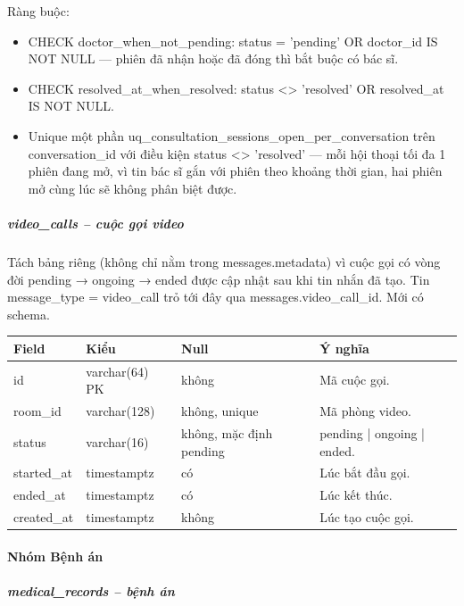 Ràng buộc:
\begin{itemize}
  \item CHECK doctor\_when\_not\_pending: status = 'pending' OR doctor\_id IS NOT NULL --- phiên đã nhận hoặc đã đóng thì bắt buộc có bác sĩ.
  \item CHECK resolved\_at\_when\_resolved: status <> 'resolved' OR resolved\_at IS NOT NULL.
  \item Unique một phần uq\_consultation\_sessions\_open\_per\_conversation trên conversation\_id với điều kiện status <> 'resolved' --- mỗi hội thoại tối đa 1 phiên đang mở, vì tin bác sĩ gắn với phiên theo khoảng thời gian, hai phiên mở cùng lúc sẽ không phân biệt được.
\end{itemize}

\subparagraph{video\_calls -- cuộc gọi video}

Tách bảng riêng (không chỉ nằm trong messages.metadata) vì cuộc gọi có vòng đời pending → ongoing → ended được cập nhật sau khi tin nhắn đã tạo. Tin message\_type = video\_call trỏ tới đây qua messages.video\_call\_id. Mới có schema.
\begin{longtable}{|>{\raggedright\arraybackslash}p{0.250\dimexpr\linewidth-8\tabcolsep\relax}|>{\raggedright\arraybackslash}p{0.250\dimexpr\linewidth-8\tabcolsep\relax}|>{\raggedright\arraybackslash}p{0.250\dimexpr\linewidth-8\tabcolsep\relax}|>{\raggedright\arraybackslash}p{0.250\dimexpr\linewidth-8\tabcolsep\relax}|}
\hline
\textbf{Field} & \textbf{Kiểu} & \textbf{Null} & \textbf{Ý nghĩa} \\ \hline
\endhead
id & varchar(64) PK & không & Mã cuộc gọi. \\ \hline
room\_id & varchar(128) & không, unique & Mã phòng video. \\ \hline
status & varchar(16) & không, mặc định pending & pending | ongoing | ended. \\ \hline
started\_at & timestamptz & có & Lúc bắt đầu gọi. \\ \hline
ended\_at & timestamptz & có & Lúc kết thúc. \\ \hline
created\_at & timestamptz & không & Lúc tạo cuộc gọi. \\ \hline
\end{longtable}

\paragraph{Nhóm Bệnh án}

\subparagraph{medical\_records -- bệnh án}


